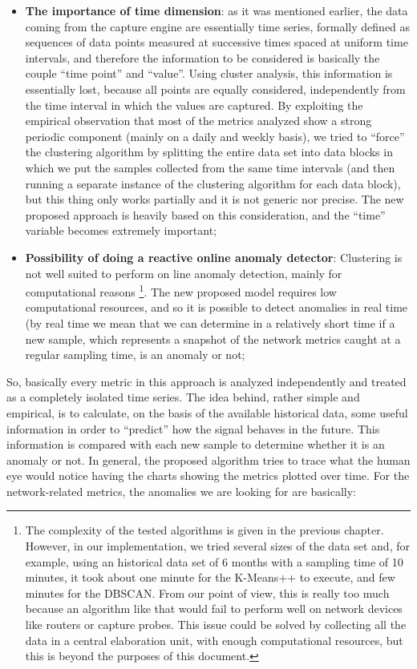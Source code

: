 \documentclass[12pt,a4paper,cucitura]{toptesi}
\begin{document}
\begin{itemize}
\item \textbf{The importance of time dimension}: as it was mentioned earlier, the data coming from the capture engine are essentially time series, formally defined as sequences of data points measured at successive times spaced at uniform time intervals, and therefore the information to be considered is basically the couple ``time point'' and ``value''. Using cluster analysis, this information is essentially lost, because all points are equally considered, independently from the time interval in which the values are captured. By exploiting the empirical observation that most of the metrics analyzed show a strong periodic component (mainly on a daily and weekly basis), we tried to ``force'' the clustering algorithm by splitting the entire data set into data blocks in which we put the samples collected from the same time intervals (and then running a separate instance of the clustering algorithm for each data block), but this thing only works partially and it is not generic nor precise. The new proposed approach is heavily based on this consideration, and the ``time'' variable becomes extremely important;

\item \textbf{Possibility of doing a reactive online anomaly detector}: Clustering is not well suited to perform on line anomaly detection, mainly for computational reasons \footnote{The complexity of the tested algorithms is given in the previous chapter. However, in our implementation, we tried several sizes of the data set and, for example, using an historical data set of 6 months with a sampling time of 10 minutes, it took about one minute for the K-Means++ to execute, and few minutes for the DBSCAN. From our point of view, this is really too much because an algorithm like that would fail to perform well on network devices like routers or capture probes. This issue could be solved by collecting all the data in a central elaboration unit, with enough computational resources, but this is beyond the purposes of this document.}. The new proposed model requires low computational resources, and so it is possible to detect anomalies in real time (by real time we mean that we can determine in a relatively short time if a new sample, which represents a snapshot of the network metrics caught at a regular sampling time, is an anomaly or not;

\end{itemize}

So, basically every metric in this approach is analyzed independently and treated as a completely isolated time series. The idea behind, rather simple and empirical, is to calculate, on the basis of the available historical data, some useful information in order to ``predict'' how the signal behaves in the future. This information is compared with each new sample to determine whether it is an anomaly or not.
In general, the proposed algorithm tries to trace what the human eye would notice having the charts showing the metrics plotted over time.
For the network-related metrics, the anomalies we are looking for are basically:
\end{document}
